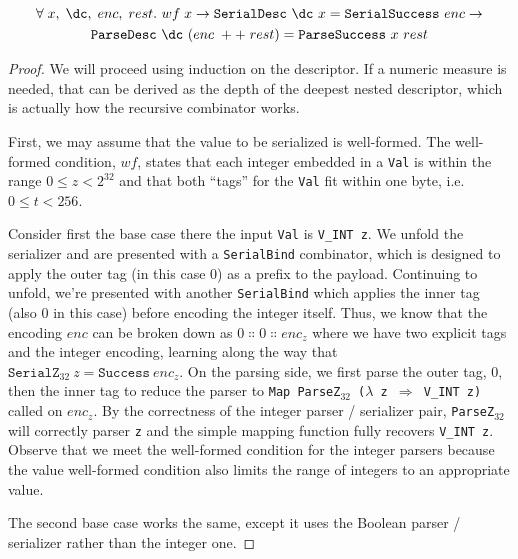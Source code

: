 \begin{theorem}
  \begin{multline*}
  \forall\;x,\;\dc,\;enc,\;rest.\ wf\;x \rightarrow \mathtt{SerialDesc}\ \dc\ x = \mathtt{SerialSuccess}\
  enc \rightarrow \\
    \mathtt{ParseDesc}\ \dc\ (enc\;++\;rest) = \mathtt{ParseSuccess}\ x\ rest
  \end{multline*}
\end{theorem}

\begin{proof}
  We will proceed using induction on the descriptor. If a numeric measure is
  needed, that can be derived as the depth of the deepest nested descriptor,
  which is actually how the recursive combinator works.

  First, we may assume that the value to be serialized is well-formed. The
  well-formed condition, $wf$, states that each integer embedded in a
  \texttt{Val} is within the range $0 \le z < 2^{32}$ and that both ``tags'' for
  the \texttt{Val} fit within one byte, i.e. $0 \le t < 256$. 

  Consider first the base case there the input \texttt{Val} is
  \verb|V_INT z|. We unfold the serializer and are presented with a
  \texttt{SerialBind} combinator, which is designed to apply the outer tag (in
  this case 0) as a prefix to the payload. Continuing to unfold, we're presented
  with another \texttt{SerialBind} which applies the inner tag (also 0 in this
  case) before encoding the integer itself. Thus, we know that the encoding
  $enc$ can be broken down as $0 \Colon 0 \Colon enc_z$ where we have two explicit tags
  and the integer encoding, learning along the way that
  $\mathtt{SerialZ}_{32}\ z = \mathtt{Success}\ enc_z$. On the parsing side, we
  first parse the outer tag, 0, then the inner tag to reduce the parser to
  \texttt{Map ParseZ$_{32}$ ($\lambda$ z $\Rightarrow$ V\_INT z)} called on $enc_z$. By the
  correctness of the integer parser / serializer pair, \texttt{ParseZ$_{32}$}
  will correctly parser \texttt{z} and the simple mapping function fully
  recovers \texttt{V\_INT z}. Observe that we meet the well-formed condition for
  the integer parsers because the value well-formed condition also limits the
  range of integers to an appropriate value.

  The second base case works the same, except it uses the Boolean parser /
  serializer rather than the integer one.


\end{proof}
